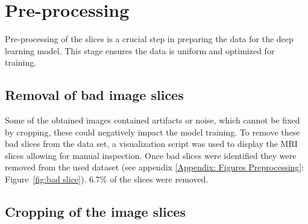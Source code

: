\documentclass[twocolumn]{article}
\begin{document}
\begin{table}[h]
\centering
{}
\caption{\label{tab:mri} Overview of the scan and image parameters used to acquire high- and low-resolution data of mice.}
\end{table}


\section{Pre-processing}

Pre-processing of the slices is a crucial step in preparing the data for the deep learning model. 
This stage ensures the data is uniform and optimized for training. 

\subsection{Removal of bad image slices}

Some of the obtained images contained artifacts or noise, which cannot be fixed by cropping, these could negatively impact the model training. 
To remove these bad slices from the data set, a visualization script was used to display the MRI slices allowing for manual inspection. 
Once bad slices were identified they were removed from the used dataset (see appendix \ref{Appendix: Figures Preprocessing}: Figure~\ref{fig:bad slice}). 6.7\% of the slices were removed.


\subsection{Cropping of the image slices}
\end{document}
